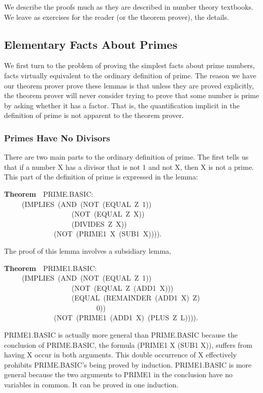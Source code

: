 \documentclass[10pt]{book}
\newenvironment{pubasis}{\begin{flushleft}}{\end{flushleft}}
\newcommand{\axiomordefinition}[1]{\vspace{6pt}\Large\textsf{\textbf{#1}}\normalsize}
\begin{document}
We  describe the proofs much as they are described in number
theory textbooks.  We leave as exercises for the reader (or the theorem
prover), the details.

\subsection{Elementary Facts About Primes}
\label{SSSELEMENTARYFACTSABOUTPRIMES}
We first turn to the problem of proving the simplest
facts about prime numbers, facts virtually
equivalent to the ordinary definition of prime.
The reason we  have our theorem prover 
prove these lemmas is that unless they are  proved explicitly,
the theorem prover will  never consider 
trying to prove that some number is prime  by asking
whether it has  a factor.  That is, the quantification
implicit in the definition of prime is not apparent
to the theorem prover.  
\subsubsection{Primes Have No Divisors}
There are two main parts to the ordinary definition of
prime.  The first tells us that if a number X has a divisor
that is not 1 and not X, then X is not a prime.  This
part of the definition of prime is expressed in the
lemma:
\begin{pubasis}
\axiomordefinition{Theorem}~~PRIME.BASIC:\\
~~~~~(IMPLIES~(AND~(NOT~(EQUAL~Z~1))\\
~~~~~~~~~~~~~~~~~~~(NOT~(EQUAL~Z~X))\\
~~~~~~~~~~~~~~~~~~~(DIVIDES~Z~X))\\
~~~~~~~~~~~~~~(NOT~(PRIME1~X~(SUB1~X)))).\\
\end{pubasis}
The proof of this lemma involves a subsidiary lemma,
\begin{pubasis}
\axiomordefinition{Theorem}~~PRIME1.BASIC:\\
~~~~~(IMPLIES~(AND~(NOT~(EQUAL~Z~1))\\
~~~~~~~~~~~~~~~~~~~(NOT~(EQUAL~Z~(ADD1~X)))\\
~~~~~~~~~~~~~~~~~~~(EQUAL~(REMAINDER~(ADD1~X)~Z)\\
~~~~~~~~~~~~~~~~~~~~~~~~~~0))\\
~~~~~~~~~~~~~~(NOT~(PRIME1~(ADD1~X)~(PLUS~Z~L)))).\\
\end{pubasis}
PRIME1.BASIC is actually more general than  PRIME.BASIC
because the conclusion of PRIME.BASIC,  the
formula (PRIME1 X (SUB1 X)),  suffers from having
X occur in both arguments.  This double occurrence
of X effectively prohibits PRIME.BASIC's being 
proved by induction.  PRIME1.BASIC is more general
because the two arguments to PRIME1 in the conclusion
have no variables in common.  It can be proved in one induction.
\end{document}

